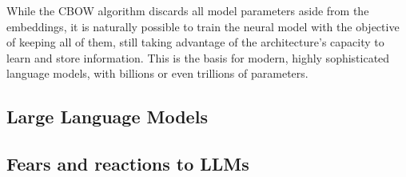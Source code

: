 While the CBOW algorithm discards all model parameters aside from the embeddings, it is naturally possible to train the neural model with the objective of keeping all of them, still taking advantage of the architecture's capacity to learn and store information. This is the basis for modern, highly sophisticated language models, with billions or even trillions of parameters.

\subsection{Large Language Models}


\subsection{Fears and reactions to LLMs}